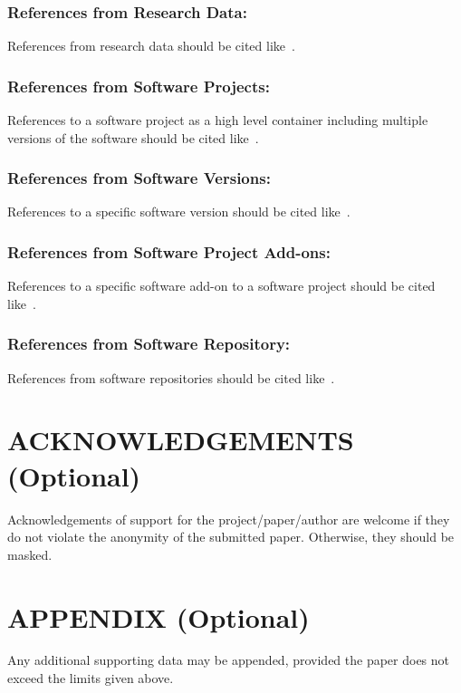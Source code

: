 \documentclass{isprs} %
\begin{document}
\subsubsection{References from Research Data:}
References from research data should be cited like~\cite{dubayah2013}.

\subsubsection{References from Software Projects:}
References to a software project as a high level container including multiple versions of the software should be cited like~\cite{grass2017}.

\subsubsection{References from Software Versions:}
References to a specific software version should be cited like~\cite{grass2015}.

\subsubsection{References from Software Project Add-ons:}
References to a specific software add-on to a software project should be cited like~\cite{lennert2017}.

\subsubsection{References from Software Repository:}
References from software repositories should be cited like~\cite{gago2016}.

\section*{ACKNOWLEDGEMENTS (Optional)}\label{ACKNOWLEDGEMENTS}
Acknowledgements of support for the project/paper/author are welcome if they do not violate the anonymity of the submitted paper. Otherwise, they should be masked. 

{
	\begin{spacing}{1.17}
		\normalsize
	\end{spacing}
}


\section*{APPENDIX (Optional)}\label{APPENDIX}

Any additional supporting data may be appended, provided the paper does not exceed the limits given above. 
\end{document}
